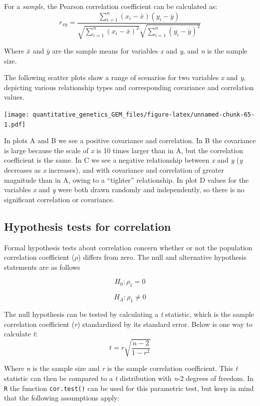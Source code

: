 \documentclass[
]{book}
\begin{document}
For a \emph{sample}, the Pearson correlation coefficient can be calculated as:
\[r_{xy}=\frac{\sum_{i=1}^n (x_i-\bar{x})(y_i-\bar{y})}{\sqrt{\sum_{i=1}^n (x_i-\bar{x})^2}\sqrt{\sum_{i=1}^n (y_i-\bar{y})^2}}\]

Where \(\bar{x}\) and \(\bar{y}\) are the sample means for variables \emph{x} and \emph{y}, and \emph{n} is the sample size.

The following scatter plots show a range of scenarios for two variables \emph{x} and \emph{y}, depicting various relationship types and corresponding covariance and correlation values.

\texttt{[image: quantitative\_genetics\_GEM\_files/figure-latex/unnamed-chunk-65-1.pdf]}

In plots A and B we see a positive covariance and correlation. In B the covariance is large because the scale of \emph{x} is 10 times larger than in A, but the correlation coefficient is the same. In C we see a negative relationship between \emph{x} and \emph{y} (\emph{y} decreases as \emph{x} increases), and with covariance and correlation of greater magnitude than in A, owing to a ``tighter'' relationship. In plot D values for the variables \emph{x} and \emph{y} were both drawn randomly and independently, so there is no significant correlation or covariance.

\hypertarget{hypothesis-tests-for-correlation}{%
\subsection{Hypothesis tests for correlation}\label{hypothesis-tests-for-correlation}}

Formal hypothesis tests about correlation concern whether or not the population correlation coefficient (\(\rho\)) differs from zero. The null and alternative hypothesis statements are as follows

\[H_0 : \rho_1 = 0\]

\[H_A: \rho_1 \neq 0\]

The null hypothesis can be tested by calculating a \emph{t} statistic, which is the sample correlation coefficient (\emph{r}) standardized by its standard error. Below is one way to calculate \emph{t}:
\[t=r\sqrt{\frac{n-2}{1-r^2}}\]

Where \emph{n} is the sample size and \emph{r} is the sample correlation coefficient. This \emph{t} statistic can then be compared to a \emph{t} distribution with \emph{n}-2 degrees of freedom. In \texttt{R} the function \texttt{cor.test()} can be used for this parametric test, but keep in mind that the following assumptions apply:
\end{document}
